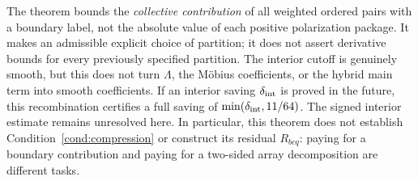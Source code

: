 The theorem bounds the \emph{collective contribution} of all weighted ordered pairs with a boundary label, not the absolute value of each positive polarization package.
It makes an admissible explicit choice of partition; it does not assert derivative bounds for every previously specified partition.
The interior cutoff is genuinely smooth, but this does not turn $\Lambda$, the M\"obius coefficients, or the hybrid main term into smooth coefficients.
If an interior saving $\delta_{\rm int}$ is proved in the future, this recombination certifies a full saving of $\min(\delta_{\rm int},11/64)$. The signed interior estimate remains unresolved here.
In particular, this theorem does not establish Condition~\ref{cond:compression} or construct its residual $R_{bcq}$: paying for a boundary contribution and paying for a two-sided array decomposition are different tasks.
